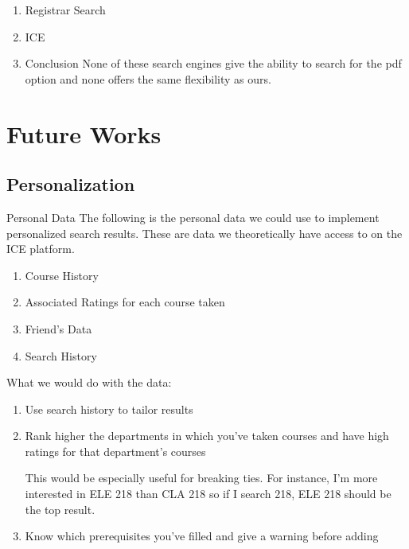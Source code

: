 \documentclass[12pt,letterpaper]{article}
\begin{document}
\begin{enumerate}
\item Registrar Search
  
  
\item ICE
  
\item Conclusion
  None of these search engines give the ability to search for the pdf option and none offers the same flexibility as ours.
\end{enumerate}

\section{Future Works}

\subsection{Personalization}

Personal Data
The following is the personal data we could use to implement personalized search results. These are data we theoretically have access to on the ICE platform.
\begin{enumerate}
\item Course History
\item Associated Ratings for each course taken
\item Friend's Data
\item Search History
\end{enumerate}
What we would do with the data:
\begin{enumerate}
\item Use search history to tailor results

\item Rank higher the departments in which you've taken courses and have high ratings for that department's courses

This would be especially useful for breaking ties. For instance, I'm more interested in ELE 218 than CLA 218 so if I search 218, ELE 218 should be the top result. 

\item Know which prerequisites you've filled and give a warning before adding

\end{enumerate}

	
\end{document}
